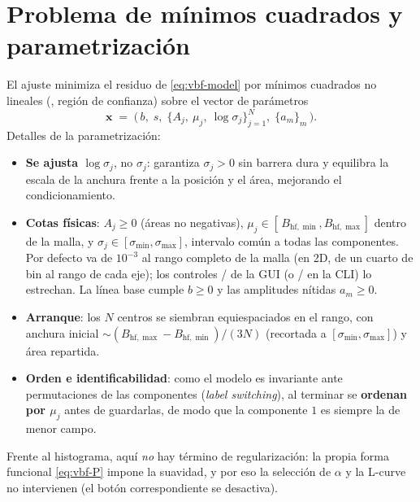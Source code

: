 \section{Problema de mínimos cuadrados y parametrización}
\label{sec:vbf-lsq}

El ajuste minimiza el residuo de \eqref{eq:vbf-model} por mínimos cuadrados no
lineales (, región de confianza) sobre el
vector de parámetros
\begin{equation}
  \bm x \;=\; \bigl(\,b,\; s,\; \{A_j,\ \mu_j,\ \log\sigma_j\}_{j=1}^{N},\;
  \{a_m\}_m\,\bigr).
  \label{eq:vbf-x}
\end{equation}
Detalles de la parametrización:
\begin{itemize}[nosep]
  \item \textbf{Se ajusta $\log\sigma_j$}, no $\sigma_j$: garantiza $\sigma_j>0$
        sin barrera dura y equilibra la escala de la anchura frente a la posición
        y el área, mejorando el condicionamiento.
  \item \textbf{Cotas físicas}: $A_j\ge0$ (áreas no negativas),
        $\mu_j\in[\,B_{\mathrm{hf},\min},B_{\mathrm{hf},\max}]$ dentro de la malla, y
        $\sigma_j\in[\sigma_{\min},\sigma_{\max}]$, intervalo común a todas las
        componentes. Por defecto va de $10^{-3}$ al rango completo de la malla
        (en 2D, de un cuarto de bin al rango de cada eje); los controles
        / de la GUI (o
        / en la CLI) lo estrechan.
        La línea base cumple $b\ge0$ y las amplitudes nítidas $a_m\ge0$.
  \item \textbf{Arranque}: los $N$ centros se siembran equiespaciados en el rango,
        con anchura inicial $\sim(B_{\mathrm{hf},\max}-B_{\mathrm{hf},\min})/(3N)$
        (recortada a $[\sigma_{\min},\sigma_{\max}]$) y área repartida.
  \item \textbf{Orden e identificabilidad}: como el modelo es invariante ante
        permutaciones de las componentes (\emph{label switching}), al terminar se
        \textbf{ordenan por $\mu_j$} antes de guardarlas, de modo que la
        componente $1$ es siempre la de menor campo.
\end{itemize}

Frente al histograma, aquí \emph{no} hay término de regularización: la propia
forma funcional \eqref{eq:vbf-P} impone la suavidad, y por eso la selección de
$\alpha$ y la L-curve no intervienen (el botón correspondiente se desactiva).

